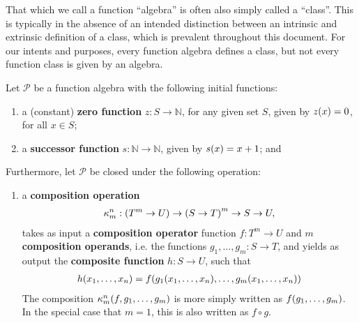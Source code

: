 \begin{remark} That which we call a function ``algebra'' is often also simply
called a ``class''. This is typically in the absence of an intended distinction
between an intrinsic and extrinsic definition of a class, which is prevalent
throughout this document. For our intents and purposes, every function algebra
defines a class, but not every function class is given by an algebra.
\end{remark} 

\begin{definition} \label{def:function-algebra-p} Let $\mathcal{P}$ be a
function algebra with the following initial functions:

\begin{enumerate}[label=(\arabic*)]

\item a (constant) \textbf{zero function} $z : S \rightarrow \mathbb{N}$, for
any given set $S$, given by $z{\mathopen{}\left({x}\right)\mathclose{}} = 0$, for all $x \in S$;

\item a \textbf{successor function} $s : \mathbb{N} \rightarrow \mathbb{N}$, given by
$s{\mathopen{}\left({x}\right)\mathclose{}} = x + 1$; and



\end{enumerate}

Furthermore, let $\mathcal{P}$ be closed under the following operation:

\begin{enumerate}[label=(\arabic*),start=3]

\item a \textbf{composition operation}\begin{align*}
%
\kappa^n_m : \p{T^m \rightarrow U} \rightarrow \p{S \rightarrow T}^m
\rightarrow S \rightarrow U,
%
\end{align*}takes as input a \textbf{composition operator} function $f : T^m
\rightarrow U$ and $m$ \textbf{composition operands}, i.e. the functions $g_1,
\ldots, g_m : S \rightarrow T$, and yields as output the \textbf{composite
function} $h : S \rightarrow U$, such that\begin{align*}
%
h\p{x_1,\ldots,x_n} = f\p{g_1\p{x_1,\ldots,x_n}, \ldots, g_m\p{x_1,
\ldots,x_n}}
%
\end{align*} The composition $\kappa^n_m{\mathopen{}\left({f,g_1,\ldots,g_m}\right)\mathclose{}}$ is more simply
written as $f{\mathopen{}\left({g_1,\ldots,g_m}\right)\mathclose{}}$. In the special case that $m=1$, this is also
written as $f \circ g$.

\end{enumerate}

\end{definition}

